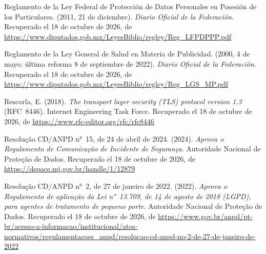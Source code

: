 \documentclass[12pt, a4paper]{article}
\begin{document}
\begin{list}{}{\setlength{\leftmargin}{1.27cm}\setlength{\itemindent}{-1.27cm}%
  \setlength{\labelwidth}{0pt}\setlength{\labelsep}{0pt}\setlength{\itemsep}{6pt}}
\item Reglamento de la Ley Federal de Protección de Datos
  Personales en Posesión de los Particulares. (2011,
  21 de diciembre). \textit{Diario Oficial de la Federación}. Recuperado el 18 de octubre de 2026, de \url{https://www.diputados.gob.mx/LeyesBiblio/regley/Reg_LFPDPPP.pdf}

  
  \item Reglamento de la Ley General de Salud en Materia de Publicidad.
    (2000, 4 de mayo; última reforma 8 de septiembre de 2022). \textit{Diario Oficial de la Federación}. Recuperado el 18 de octubre de 2026, de \url{https://www.diputados.gob.mx/LeyesBiblio/regley/Reg_LGS_MP.pdf}
 

\item Rescorla, E. (2018). \textit{The transport layer security
  (TLS) protocol version 1.3} (RFC~8446). Internet Engineering
  Task Force.
  Recuperado el 18 de octubre de 2026, de \url{https://www.rfc-editor.org/rfc/rfc8446}


\item Resolução CD/ANPD n°~15, de 24 de abril de 2024. (2024).
  \textit{Aprova o Regulamento de Comunicação de Incidente de
  Segurança}. Autoridade Nacional de Proteção de Dados.
  Recuperado el 18 de octubre de 2026, de \url{https://dspace.mj.gov.br/handle/1/12879}
 
  
\item Resolução CD/ANPD n°~2, de 27 de janeiro de 2022. (2022).
  \textit{Aprova o Regulamento de aplicação da Lei n°~13.709, de
  14 de agosto de 2018 (LGPD), para agentes de tratamento de
  pequeno porte}. Autoridade Nacional de Proteção de Dados.
  Recuperado el 18 de octubre de 2026, de \url{https://www.gov.br/anpd/pt-br/acesso-a-informacao/institucional/atos-normativos/regulamentacoes_anpd/resolucao-cd-anpd-no-2-de-27-de-janeiro-de-2022}
 

\end{list}
\end{document}
